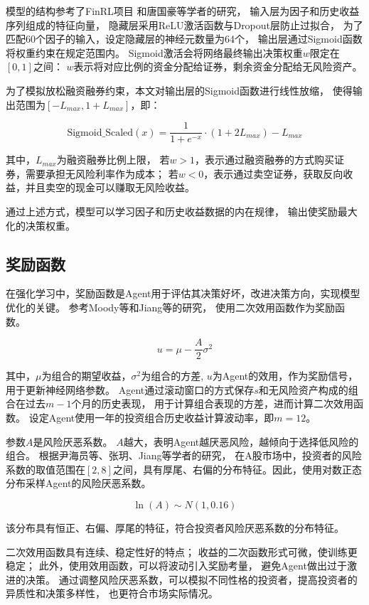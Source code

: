 模型的结构参考了FinRL项目\cite{liu2021finrl}
和唐国豪\cite{唐国豪2025投资者预期协同}等学者的研究，
输入层为因子和历史收益序列组成的特征向量，
隐藏层采用ReLU激活函数与Dropout层防止过拟合，
为了匹配60个因子的输入，设定隐藏层的神经元数量为64个，
输出层通过Sigmoid函数将权重约束在规定范围内。
Sigmoid激活会将网络最终输出决策权重$w$限定在$[0,1]$之间：
$w$表示将对应比例的资金分配给证券，剩余资金分配给无风险资产。

为了模拟放松融资融券约束，本文对输出层的Sigmoid函数进行线性放缩，
使得输出范围为$[-L_{max}, 1+L_{max}]$，即：

\[
\mathrm{Sigmoid\_Scaled}(x) = \frac{1}{1+e^{-x}} \cdot (1+2L_{max}) - L_{max}
\]

其中，$L_{max}$为融资融券比例上限，
若$w > 1$，表示通过融资融券的方式购买证券，需要承担无风险利率作为成本；
若$w < 0$，表示通过卖空证券，获取反向收益，并且卖空的现金可以赚取无风险收益。

通过上述方式，模型可以学习因子和历史收益数据的内在规律，
输出使奖励最大化的决策权重。

\subsection{奖励函数}  
在强化学习中，奖励函数是Agent用于评估其决策好坏，改进决策方向，实现模型优化的关键。
参考Moody等\cite{moody1998performance}和Jiang等\cite{jiang2017deep}的研究，
使用二次效用函数\cite{markowitz1956optimization}作为奖励函数。

\[u = \mu - \frac{A}{2} \sigma^2\]

其中，$\mu$为组合的期望收益，$\sigma^2$为组合的方差,
$u$为Agent的效用，作为奖励信号，用于更新神经网络参数。
Agent通过滚动窗口的方式保存$s$和无风险资产构成的组合在过去$m-1$个月的历史表现，
用于计算组合表现的方差，进而计算二次效用函数。
设定Agent使用一年的投资组合历史收益计算波动率，即$m=12$。

参数$A$是风险厌恶系数。
$A$越大，表明Agent越厌恶风险，越倾向于选择低风险的组合。
根据尹海员等\cite{yin2011speciality}、张玥\cite{zhang2019china}、Jiang\cite{jiang2023dynamic}等学者的研究，
在A股市场中，投资者的风险系数的取值范围在$[2,8]$之间，具有厚尾、右偏的分布特征。因此，使用对数正态分布采样Agent的风险厌恶系数。

\[\ln(A) \sim N(1, 0.16)\]

该分布具有恒正、右偏、厚尾的特征，符合投资者风险厌恶系数的分布特征。

二次效用函数具有连续、稳定性好的特点；
收益的二次函数形式可微，使训练更稳定；
此外，使用效用函数，可以将波动引入奖励考量，
避免Agent做出过于激进的决策。
通过调整风险厌恶系数，可以模拟不同性格的投资者，提高投资者的异质性和决策多样性，
也更符合市场实际情况。


